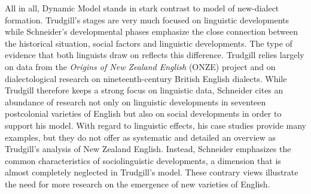 All in all,  Dynamic Model stands in stark contrast to  model of new-dialect formation. Trudgill’s stages are very much focused on linguistic developments while Schneider’s developmental phases emphasize the close connection between the historical situation, social factors and linguistic developments. The type of evidence that both linguists draw on reflects this difference. Trudgill relies largely on data from the \emph{Origins of New Zealand English} (ONZE) project and on dialectological research on nineteenth-century British English dialects. While Trudgill therefore keeps a strong focus on linguistic data, Schneider cites an abundance of research not only on linguistic developments in seventeen postcolonial varieties of English but also on social developments in order to support his model. With regard to linguistic effects, his case studies provide many examples, but they do not offer as systematic and detailed an overview as Trudgill’s analysis of New Zealand English. Instead, Schneider emphasizes the common characteristics of sociolinguistic developments, a dimension that is almost completely neglected in Trudgill’s model. These contrary views illustrate the need for more research on the emergence of new varieties of English.

